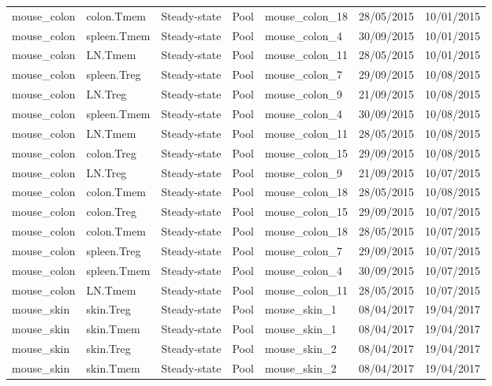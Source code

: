 \begin{table}[H]
\begin{tabular}{lllllll}
  mouse\_colon & colon.Tmem & Steady-state & Pool & mouse\_colon\_18 & 28/05/2015 & 10/01/2015 \\ 
  mouse\_colon & spleen.Tmem & Steady-state & Pool & mouse\_colon\_4 & 30/09/2015 & 10/01/2015 \\ 
  mouse\_colon & LN.Tmem & Steady-state & Pool & mouse\_colon\_11 & 28/05/2015 & 10/01/2015 \\ 
  mouse\_colon & spleen.Treg & Steady-state & Pool & mouse\_colon\_7 & 29/09/2015 & 10/08/2015 \\ 
  mouse\_colon & LN.Treg & Steady-state & Pool & mouse\_colon\_9 & 21/09/2015 & 10/08/2015 \\ 
  mouse\_colon & spleen.Tmem & Steady-state & Pool & mouse\_colon\_4 & 30/09/2015 & 10/08/2015 \\ 
  mouse\_colon & LN.Tmem & Steady-state & Pool & mouse\_colon\_11 & 28/05/2015 & 10/08/2015 \\ 
  mouse\_colon & colon.Treg & Steady-state & Pool & mouse\_colon\_15 & 29/09/2015 & 10/08/2015 \\ 
  mouse\_colon & LN.Treg & Steady-state & Pool & mouse\_colon\_9 & 21/09/2015 & 10/07/2015 \\ 
  mouse\_colon & colon.Tmem & Steady-state & Pool & mouse\_colon\_18 & 28/05/2015 & 10/08/2015 \\ 
  mouse\_colon & colon.Treg & Steady-state & Pool & mouse\_colon\_15 & 29/09/2015 & 10/07/2015 \\ 
  mouse\_colon & colon.Tmem & Steady-state & Pool & mouse\_colon\_18 & 28/05/2015 & 10/07/2015 \\ 
  mouse\_colon & spleen.Treg & Steady-state & Pool & mouse\_colon\_7 & 29/09/2015 & 10/07/2015 \\ 
  mouse\_colon & spleen.Tmem & Steady-state & Pool & mouse\_colon\_4 & 30/09/2015 & 10/07/2015 \\ 
  mouse\_colon & LN.Tmem & Steady-state & Pool & mouse\_colon\_11 & 28/05/2015 & 10/07/2015 \\ 
  mouse\_skin & skin.Treg & Steady-state & Pool & mouse\_skin\_1 & 08/04/2017 & 19/04/2017 \\ 
  mouse\_skin & skin.Tmem & Steady-state & Pool & mouse\_skin\_1 & 08/04/2017 & 19/04/2017 \\ 
  mouse\_skin & skin.Treg & Steady-state & Pool & mouse\_skin\_2 & 08/04/2017 & 19/04/2017 \\ 
  mouse\_skin & skin.Tmem & Steady-state & Pool & mouse\_skin\_2 & 08/04/2017 & 19/04/2017 \\ 

\end{tabular}
\end{table}
